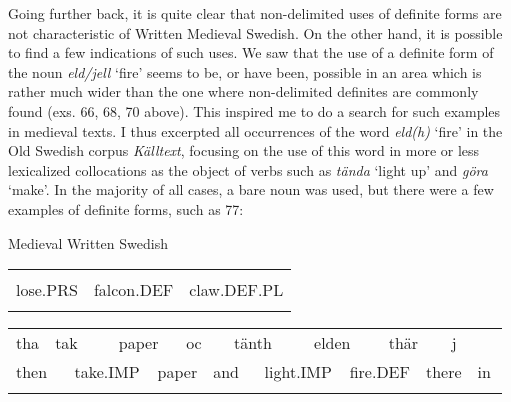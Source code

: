 \begin{styleBodytextC}
Going further back, it is quite clear that non-delimited uses of definite forms are not characteristic of Written Medieval Swedish. On the other hand, it is possible to find a few indications of such uses. We saw that the use of a definite form of the noun \textit{eld/jell} ‘fire’ seems to be, or have been, possible in an area which is rather much wider than the one where non-delimited definites are commonly found (exs. 66, 68, 70 above). This inspired me to do a search for such examples in medieval texts. I thus excerpted all occurrences of the word \textit{eld(h)} ‘fire’ in the Old Swedish corpus \textit{Källtext}, focusing on the use of this word in more or less lexicalized collocations as the object of verbs such as \textit{tända} ‘light up’ and \textit{göra} ‘make’. In the majority of all cases, a bare noun was used, but there were a few examples of definite forms, such as 77:

\end{styleBodytextC}

\begin{listWWNumileveli}
\item 

\begin{styleExample}
\label{bkm:Ref64457141}Medieval Written Swedish

\end{styleExample}

\end{listWWNumileveli}

\begin{tabular}{lll}
\lsptoprule
\multicolumn{3}{l}{Misther

}\\
lose.PRS & falcon.DEF & claw.DEF.PL\\
\lspbottomrule
\end{tabular}

\begin{tabular}{llllllllllllllll}
\lsptoprule
tha & \multicolumn{2}{l}{tak

} & \multicolumn{2}{l}{paper

} & \multicolumn{2}{l}{oc

} & \multicolumn{2}{l}{tänth

} & \multicolumn{2}{l}{elden

} & \multicolumn{2}{l}{thär

} & \multicolumn{2}{l}{j

} & \\
\multicolumn{2}{l}{then

} & \multicolumn{2}{l}{take.IMP

} & \multicolumn{2}{l}{paper

} & \multicolumn{2}{l}{and

} & \multicolumn{2}{l}{light.IMP

} & \multicolumn{2}{l}{fire.DEF

} & \multicolumn{2}{l}{there 

} & \multicolumn{2}{l}{in

}\\
\lspbottomrule
\end{tabular}

